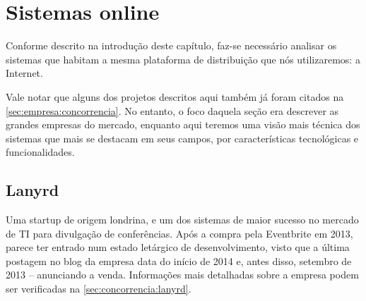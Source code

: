\documentclass[12pt,a4paper,twoside,hyphens,english,brazil]{abntex2}
\begin{document}
\section{Sistemas online} \label{sec:sistemas:online}
Conforme descrito na introdução deste capítulo, faz-se necessário analisar os sistemas que habitam a mesma plataforma de distribuição que nós utilizaremos: a Internet.

Vale notar que alguns dos projetos descritos aqui também já foram citados na \autoref{sec:empresa:concorrencia}. No entanto, o foco daquela seção era descrever as grandes empresas do mercado, enquanto aqui teremos uma visão mais técnica dos sistemas que mais se destacam em seus campos, por características tecnológicas e funcionalidades.

\subsection{Lanyrd} \label{sec:concorrencia:lanyrd:tec}
Uma startup de origem londrina, e um dos sistemas de maior sucesso no mercado de TI para divulgação de conferências. Após a compra pela Eventbrite em 2013, parece ter entrado num estado letárgico de desenvolvimento, visto que a última postagem no blog da empresa data do início de 2014 e, antes disso, setembro de 2013 -- anunciando a venda. Informações mais detalhadas sobre a empresa podem ser verificadas na \autoref{sec:concorrencia:lanyrd}.
\end{document}
